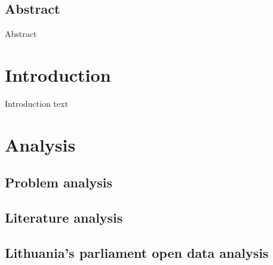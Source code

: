 \documentclass[a4paper,12pt]{article}
\begin{document}
    
    
    
    \begin{center}
        \section*{Abstract}
    \end{center}
        
        Abstract
    \clearpage
    
    \tableofcontents
    
    \clearpage
    
    \printglossary[type=\acronymtype]
    
    \clearpage
    
    \printglossary
    
    \clearpage
    
    
    \section{Introduction}
    
    Introduction text

    
    \clearpage
    
    \section{Analysis}
    
    \subsection{Problem analysis}
    
    
    
   	\subsection{Literature analysis}
 	\subsection{Lithuania's parliament open data analysis }
\end{document}
